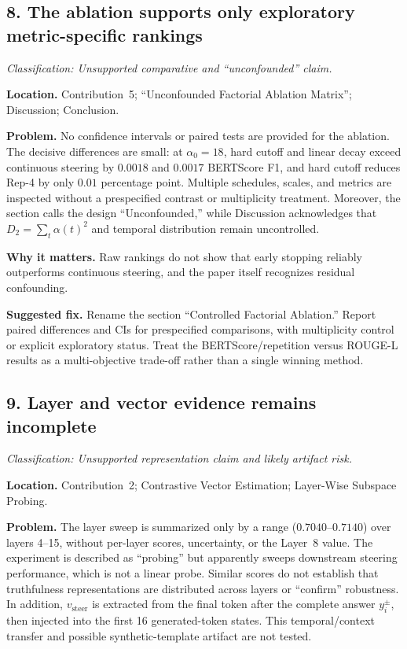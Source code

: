 \documentclass[11pt]{article}
\newcommand{\findinglabel}[1]{\textbf{#1}}
\newcommand{\classification}[1]{\textit{Classification: #1.}}
\begin{document}
\subsection*{8. The ablation supports only exploratory metric-specific rankings}

\classification{Unsupported comparative and ``unconfounded'' claim}

\findinglabel{Location.} Contribution~5; ``Unconfounded Factorial Ablation Matrix''; Discussion; Conclusion.

\findinglabel{Problem.} No confidence intervals or paired tests are provided for the ablation.  The decisive differences are small: at $\alpha_0=18$, hard cutoff and linear decay exceed continuous steering by $0.0018$ and $0.0017$ BERTScore F1, and hard cutoff reduces Rep-4 by only $0.01$ percentage point.  Multiple schedules, scales, and metrics are inspected without a prespecified contrast or multiplicity treatment.  Moreover, the section calls the design ``Unconfounded,'' while Discussion acknowledges that $D_2=\sum_t\alpha(t)^2$ and temporal distribution remain uncontrolled.

\findinglabel{Why it matters.} Raw rankings do not show that early stopping reliably outperforms continuous steering, and the paper itself recognizes residual confounding.

\findinglabel{Suggested fix.} Rename the section ``Controlled Factorial Ablation.''  Report paired differences and CIs for prespecified comparisons, with multiplicity control or explicit exploratory status.  Treat the BERTScore/repetition versus ROUGE-L results as a multi-objective trade-off rather than a single winning method.

\subsection*{9. Layer and vector evidence remains incomplete}

\classification{Unsupported representation claim and likely artifact risk}

\findinglabel{Location.} Contribution~2; Contrastive Vector Estimation; Layer-Wise Subspace Probing.

\findinglabel{Problem.} The layer sweep is summarized only by a range ($0.7040$--$0.7140$) over layers 4--15, without per-layer scores, uncertainty, or the Layer~8 value.  The experiment is described as ``probing'' but apparently sweeps downstream steering performance, which is not a linear probe.  Similar scores do not establish that truthfulness representations are distributed across layers or ``confirm'' robustness.  In addition, $v_{\mathrm{steer}}$ is extracted from the final token after the complete answer $y_i^{\pm}$, then injected into the first 16 generated-token states.  This temporal/context transfer and possible synthetic-template artifact are not tested.
\end{document}
